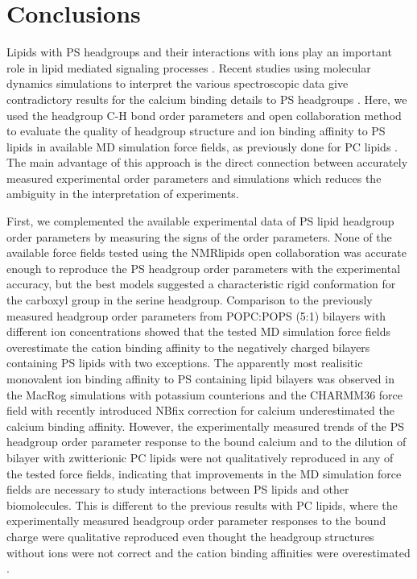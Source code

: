 \documentclass[aps,prl,superscriptaddress,twocolumn]{revtex4}
\begin{document}
\section{Conclusions}
Lipids with PS headgroups and their interactions with ions
play an important role in lipid mediated signaling
processes \cite{leventis10,yeung08}. Recent studies using molecular
dynamics simulations to interpret the various spectroscopic data
give contradictory results for the calcium binding details to PS
headgroups \cite{melcrova16,valentine18,hallock18}.  
Here, we used the headgroup C-H bond order parameters and open collaboration method to evaluate the quality
of headgroup structure and ion binding affinity to PS lipids
in available MD simulation force fields,
as previously done for PC lipids \cite{botan15,catte16}.
The main advantage of this approach is the direct connection
between accurately measured experimental order parameters and simulations
which reduces the ambiguity in the interpretation of experiments.

First, we complemented the available experimental data of PS
lipid headgroup order parameters \cite{browning80,roux90} by measuring the signs of the order parameters.
None of the available force fields tested using the NMRlipids open
collaboration was accurate enough to reproduce the PS
headgroup order parameters with the experimental accuracy, but
the best models suggested a characteristic rigid conformation for the
carboxyl group in the serine headgroup. Comparison to the previously
measured headgroup order parameters from POPC:POPS (5:1) bilayers with different ion
concentrations \cite{roux90} showed that the tested MD simulation force fields
overestimate the cation binding affinity to the negatively charged bilayers
containing PS lipids with two exceptions. The apparently most realisitic monovalent ion binding
affinity to PS containing lipid bilayers was observed in the MacRog
simulations with potassium counterions and the CHARMM36 force field with recently introduced
NBfix correction for calcium \cite{kim16} underestimated the calcium binding affinity.
However, the experimentally measured trends of the PS headgroup order parameter response
to the bound calcium and to the dilution of bilayer with zwitterionic PC lipids were not
qualitatively reproduced in any of the tested force fields, indicating that improvements in
the MD simulation force fields are necessary to study interactions between PS lipids and other biomolecules.
This is different to the previous results with PC lipids,
where the experimentally measured headgroup order parameter responses to the bound charge
were qualitative reproduced even thought the headgroup structures without ions were not
correct and the cation binding affinities were overestimated \cite{catte16}.
\end{document}
